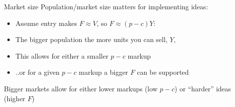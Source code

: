 \begin{frame}{Market size}
Population/market size matters for implementing ideas:
\begin{itemize}
	\item Assume entry makes $F \approx V$, so $F \approx (p-c)Y$:
	\item The bigger population the more units you can sell, $Y$, 
	\item This allows for either a smaller $p-c$ markup
	\item ..or for a given $p-c$ markup a bigger $F$ can be supported
\end{itemize}
Bigger markets allow for either lower markups (low $p-c$) or ``harder'' ideas (higher $F$)
\end{frame}

